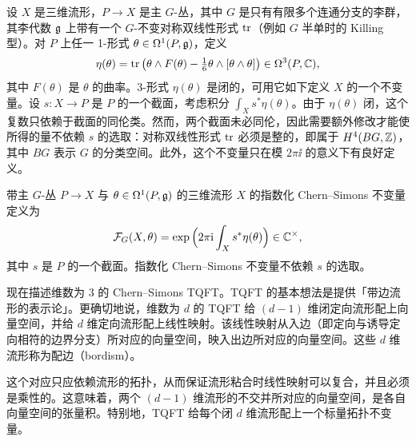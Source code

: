 设 $X$ 是三维流形，$P\to X$ 是主 $G$-丛，其中 $G$ 是只有有限多个连通分支的李群，其李代数 $\mathfrak{g}$ 上带有一个 $G$-不变对称双线性形式 $\operatorname{tr}$（例如 $G$ 半单时的 Killing 型）。对 $P$ 上任一 1-形式 $\theta\in\Omega^1(P,\mathfrak{g})$，定义
\[
\eta(\theta)=\operatorname{tr}\big(\theta\wedge F(\theta)-\tfrac{1}{6}\theta\wedge[\theta\wedge\theta]\big)\in\Omega^3(P,\mathbb{C}),
\]
其中 $F(\theta)$ 是 $\theta$ 的曲率。3-形式 $\eta(\theta)$ 是闭的，可用它如下定义 $X$ 的一个不变量。设 $s:X\to P$ 是 $P$ 的一个截面，考虑积分 $\int_X s^*\eta(\theta)$。由于 $\eta(\theta)$ 闭，这个复数只依赖于截面的同伦类。然而，两个截面未必同伦，因此需要额外修改才能使所得的量不依赖 $s$ 的选取：对称双线性形式 $\operatorname{tr}$ 必须是整的，即属于 $H^4(BG,\mathbb{Z})$，其中 $BG$ 表示 $G$ 的分类空间。此外，这个不变量只在模 $2\pi\ii$ 的意义下有良好定义。

\begin{definition}[24.2]
带主 $G$-丛 $P\to X$ 与 $\theta\in\Omega^1(P,\mathfrak{g})$ 的三维流形 $X$ 的指数化 Chern–Simons 不变量定义为
\[
\mathcal{F}_G(X,\theta)=\exp\Big(2\pi\mathrm{i}\int_X s^*\eta(\theta)\Big)\in\mathbb{C}^\times,
\]
其中 $s$ 是 $P$ 的一个截面。指数化 Chern–Simons 不变量不依赖 $s$ 的选取。
\end{definition}

现在描述维数为 3 的 Chern–Simons TQFT。TQFT 的基本想法是提供「带边流形的表示论」。更确切地说，维数为 $d$ 的 TQFT 给 $(d-1)$ 维闭定向流形配上向量空间，并给 $d$ 维定向流形配上线性映射。该线性映射从入边（即定向与诱导定向相符的边界分支）所对应的向量空间，映入出边所对应的向量空间。这些 $d$ 维流形称为配边（bordism）。

这个对应只应依赖流形的拓扑，从而保证流形粘合时线性映射可以复合，并且必须是乘性的。这意味着，两个 $(d-1)$ 维流形的不交并所对应的向量空间，是各自向量空间的张量积。特别地，TQFT 给每个闭 $d$ 维流形配上一个标量拓扑不变量。


